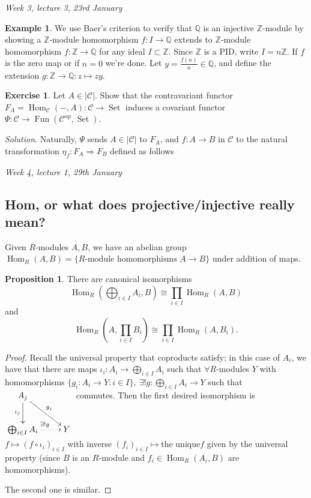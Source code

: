 \documentclass{article}
\newcommand{\Z}{\mathbb{Z}}
\newcommand{\Q}{\mathbb{Q}}
\newcommand{\Fun}{\operatorname{Fun}}
\newcommand{\Hom}{\operatorname{Hom}}
\newcommand{\op}{{\operatorname{op}}}
\newcommand{\Set}{\operatorname{Set}}
\newcommand{\ca}{\mathcal{C}}
\theoremstyle{definition}
\newtheorem{prop}[defn]{Proposition}
\newtheorem{example}[defn]{Example}
\newtheorem{exe}[defn]{Exercise}
\begin{document}
\begin{flushright}
\textit{Week 3, lecture 3, 23rd January}
\end{flushright}

\begin{example}
We use Baer's criterion to verify that $\Q$ is an injective $\Z$-module by showing a $\Z$-module homomorphism $f:I\rightarrow\Q$ extends to $\Z$-module homomorphism $f:\Z\rightarrow\Q$ for any ideal $I\subset\Z$. Since $\Z$ is a PID, write $I=n\Z$. If $f$ is the zero map or if $n=0$ we're done. Let $y=\frac{f(n)}{n}\in\Q$, and define the extension $g:\Z\rightarrow\Q:z\mapsto zy$.
\end{example}

\begin{exe}
Let $A\in|\ca|$. Show that the contravariant functor $F_A=\Hom_\ca(-,A):\ca\rightarrow\Set$ induces a covariant functor $\Psi:\ca\rightarrow\Fun(\ca^\op,\Set)$.

\textit{Solution}. Naturally, $\Psi$ sends $A\in|\ca|$ to $F_A$, and $f:A\rightarrow B$ in $\ca$ to the natural transformation $\eta_f:F_A\Rightarrow F_B$ defined as follows
\end{exe}

\begin{flushright}
\textit{Week 4, lecture 1, 29th January}
\end{flushright}

\subsection{Hom, or what does projective/injective really mean?}

Given $R$-modules $A,B$, we have an abelian group $\Hom_R(A,B)=\{R\text{-module homomorphisms }A\rightarrow B\}$ under addition of maps.

\begin{prop}
There are canonical isomorphisms
\[
\Hom_R\left(\bigoplus_{i\in I}A_i,B\right)\cong\prod_{i\in I}\Hom_R(A,B)
\]
and
\[
\Hom_R\left(A,\prod_{i\in I}B_i\right)\cong\prod_{i\in I}\Hom_R(A,B_i).
\]
\end{prop}
\begin{proof}
Recall the universal property that coproducts satisfy; in this case of $A_i$, we have that there are maps $\iota_i:A_i\rightarrow\bigoplus_{i\in I}A_i$ such that $\forall R$-modules $Y$ with homomorphisms $\{g_i:A_i\rightarrow Y:i\in I\},\ \exists! g:\bigoplus_{i\in I}A_i\rightarrow Y$ such that $\xymatrix{A_j\ar[rd]^{g_j}\ar[d]_{\iota_j}\\ \bigoplus_{i\in I}A_i\ar@{.>}[r]^{\exists! g} & Y}$ commutes. Then the first desired isomorphism is $f\mapsto (f\circ\iota_i)_{i\in I}$ with inverse $(f_i)_{i\in I}\mapsto\text{the unique}f$ given by the universal property (since $B$ is an $R$-module and $f_i\in\Hom_R(A_i,B)$ are homomorphisms).

The second one is similar.
\end{proof}
\end{document}
